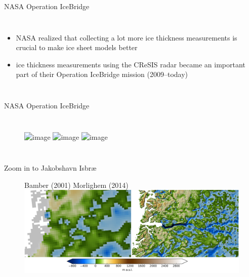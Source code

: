 \documentclass[hide notes,intlimits]{beamer}
\begin{document}
\begin{frame}{NASA Operation IceBridge}
\begin{columns}
    \column[c]{10cm}
    \begin{itemize}
    \item NASA realized that collecting a lot more ice thickness measurements is crucial to make ice sheet models better
    \item ice thickness measurements using the CReSIS radar became an important part of their Operation IceBridge mission (2009--today)
    \end{itemize}
  \end{columns}
\end{frame}


\begin{frame}{NASA Operation IceBridge}
\vspace{-0.74em}
  \begin{columns}
    \column[c]{2.5cm}
    \column[c]{6cm}
    \begin{figure}
      \includegraphics<1>[height=8cm]{greenland-bed-old}
      \includegraphics<2>[height=8cm]{greenland-bed-old-oib}
      \includegraphics<3>[height=8cm]{greenland-bed-mcb}
    \end{figure}
  \end{columns}
\end{frame}

\begin{frame}{Zoom in to Jakobshavn Isbr{\ae}}
  \begin{figure}
    \small{Bamber (2001) \hspace{5em} Morlighem (2014)}
    \includegraphics[width=12cm]{jako_bed}
 \end{figure}
\end{frame}
\end{document}
